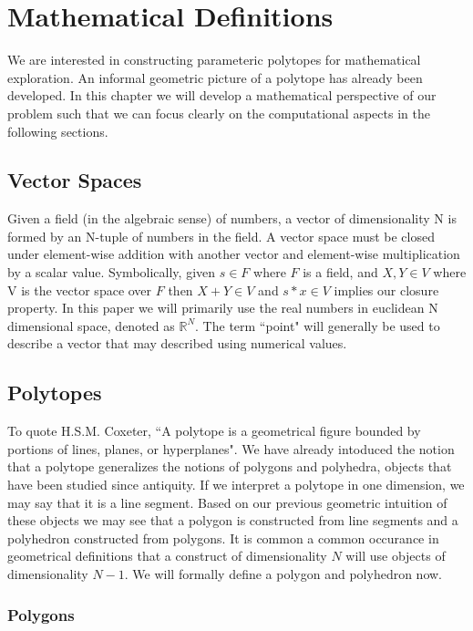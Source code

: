 
\chapter{Mathematical Definitions}

We are interested in constructing parameteric polytopes for
mathematical exploration. An informal geometric
picture of a polytope has already been developed.
In this chapter we will develop a mathematical perspective of our problem
such that we can focus clearly on the computational aspects in the following
sections. 


\section{Vector Spaces}

Given a field (in the algebraic sense) of numbers, a vector of dimensionality
N is formed by an N-tuple of numbers in the field. A vector space must
be closed under element-wise addition with another vector and element-wise
multiplication by a scalar value. Symbolically, given $s \in F$ where $F$ is a
field, and $X,Y \in V$ where V is the vector space over $F$ then
$X+Y \in V$ and $s*x \in V$ implies our closure property.
In this paper we will primarily use
the real numbers in euclidean N dimensional space, denoted as $\mathbb{R}^N$.
The term ``point" will generally be used to describe a vector that may
described using numerical values.

\section{Polytopes}

To quote H.S.M. Coxeter, ``A polytope is a geometrical figure bounded by portions of
lines, planes, or hyperplanes". We have already intoduced the notion that a
polytope generalizes the notions of polygons and polyhedra, objects
that have been studied since antiquity. If we interpret a polytope in
one dimension, we may say that it is a line segment. Based on our previous
geometric intuition of these objects we may see that a polygon is constructed
from line segments and a polyhedron constructed from polygons. It is common
a common occurance in geometrical definitions that a construct of dimensionality
$N$ will use objects of dimensionality $N-1$. We will formally define a polygon
and polyhedron now.

\subsection{Polygons}

